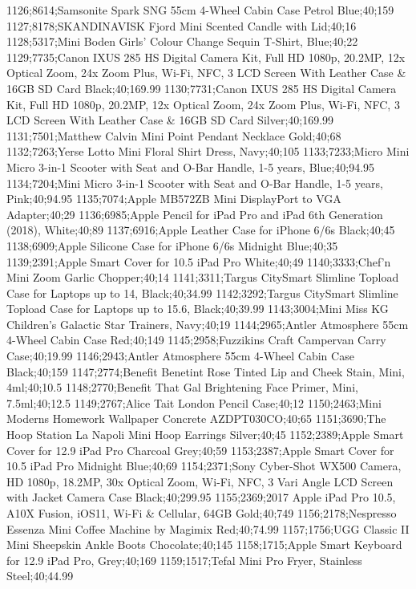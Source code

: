 1126;8614;Samsonite Spark SNG 55cm 4-Wheel Cabin Case Petrol Blue;40;159
1127;8178;SKANDINAVISK Fjord Mini Scented Candle with Lid;40;16
1128;5317;Mini Boden Girls' Colour Change Sequin T-Shirt, Blue;40;22
1129;7735;Canon IXUS 285 HS Digital Camera Kit, Full HD 1080p, 20.2MP, 12x Optical Zoom, 24x Zoom Plus, Wi-Fi, NFC, 3 LCD Screen With Leather Case & 16GB SD Card Black;40;169.99
1130;7731;Canon IXUS 285 HS Digital Camera Kit, Full HD 1080p, 20.2MP, 12x Optical Zoom, 24x Zoom Plus, Wi-Fi, NFC, 3 LCD Screen With Leather Case & 16GB SD Card Silver;40;169.99
1131;7501;Matthew Calvin Mini Point Pendant Necklace Gold;40;68
1132;7263;Yerse Lotto Mini Floral Shirt Dress, Navy;40;105
1133;7233;Micro Mini Micro 3-in-1 Scooter with Seat and O-Bar Handle, 1-5 years, Blue;40;94.95
1134;7204;Mini Micro 3-in-1 Scooter with Seat and O-Bar Handle, 1-5 years, Pink;40;94.95
1135;7074;Apple MB572ZB Mini DisplayPort to VGA Adapter;40;29
1136;6985;Apple Pencil for iPad Pro and iPad 6th Generation (2018), White;40;89
1137;6916;Apple Leather Case for iPhone 6/6s Black;40;45
1138;6909;Apple Silicone Case for iPhone 6/6s Midnight Blue;40;35
1139;2391;Apple Smart Cover for 10.5 iPad Pro White;40;49
1140;3333;Chef'n Mini Zoom Garlic Chopper;40;14
1141;3311;Targus CitySmart Slimline Topload Case for Laptops up to 14, Black;40;34.99
1142;3292;Targus CitySmart Slimline Topload Case for Laptops up to 15.6, Black;40;39.99
1143;3004;Mini Miss KG Children's Galactic Star Trainers, Navy;40;19
1144;2965;Antler Atmosphere 55cm 4-Wheel Cabin Case Red;40;149
1145;2958;Fuzzikins Craft Campervan Carry Case;40;19.99
1146;2943;Antler Atmosphere 55cm 4-Wheel Cabin Case Black;40;159
1147;2774;Benefit Benetint Rose Tinted Lip and Cheek Stain, Mini, 4ml;40;10.5
1148;2770;Benefit That Gal Brightening Face Primer, Mini, 7.5ml;40;12.5
1149;2767;Alice Tait London Pencil Case;40;12
1150;2463;Mini Moderns Homework Wallpaper Concrete AZDPT030CO;40;65
1151;3690;The Hoop Station La Napoli Mini Hoop Earrings Silver;40;45
1152;2389;Apple Smart Cover for 12.9 iPad Pro Charcoal Grey;40;59
1153;2387;Apple Smart Cover for 10.5 iPad Pro Midnight Blue;40;69
1154;2371;Sony Cyber-Shot WX500 Camera, HD 1080p, 18.2MP, 30x Optical Zoom, Wi-Fi, NFC, 3 Vari Angle LCD Screen with Jacket Camera Case Black;40;299.95
1155;2369;2017 Apple iPad Pro 10.5, A10X Fusion, iOS11, Wi-Fi & Cellular, 64GB Gold;40;749
1156;2178;Nespresso Essenza Mini Coffee Machine by Magimix Red;40;74.99
1157;1756;UGG Classic II Mini Sheepskin Ankle Boots Chocolate;40;145
1158;1715;Apple Smart Keyboard for 12.9 iPad Pro, Grey;40;169
1159;1517;Tefal Mini Pro Fryer, Stainless Steel;40;44.99
